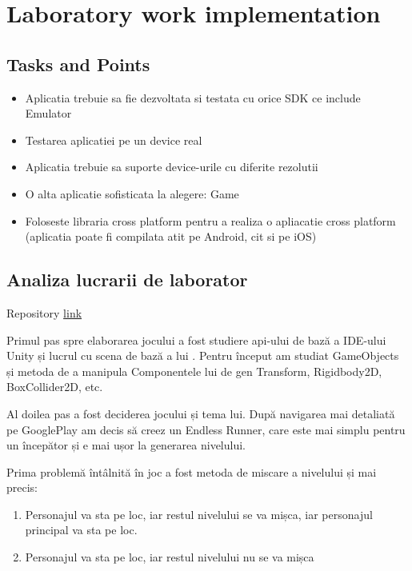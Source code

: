 \section{Laboratory work implementation}

\subsection{Tasks and Points}

\begin{itemize}
	\item Aplicatia trebuie sa fie dezvoltata si testata cu orice SDK ce include Emulator
	\item Testarea aplicatiei pe un device real
	\item Aplicatia trebuie sa suporte device-urile cu diferite rezolutii
	\item O alta aplicatie sofisticata la alegere: Game
	\item Foloseste libraria cross platform pentru a realiza o apliacatie cross platform (aplicatia poate fi compilata atit pe Android, cit si pe iOS)
\end{itemize}

\subsection{Analiza lucrarii de laborator}
Repository \href{https://github.com/AScripnic/MIDPS-laboratories/tree/master/Lab%234}{link}\par

Primul pas spre elaborarea jocului a fost studiere api-ului de bază a IDE-ului Unity și lucrul cu scena de bază a lui \cite{unity}. Pentru început am studiat GameObjects și metoda de a manipula Componentele lui de gen Transform, Rigidbody2D, BoxCollider2D, etc.

Al doilea pas a fost deciderea jocului și tema lui. După navigarea mai detaliată pe GooglePlay am decis să creez un Endless Runner, care este mai simplu pentru un începător și e mai ușor la generarea nivelului.

Prima problemă întâlnită în joc a fost metoda de miscare a nivelului și mai precis:

\begin{enumerate}
	\item Personajul va sta pe loc, iar restul nivelului se va mișca, iar personajul principal va sta pe loc.
	\item Personajul va sta pe loc, iar restul nivelului nu se va mișca
\end{enumerate}

